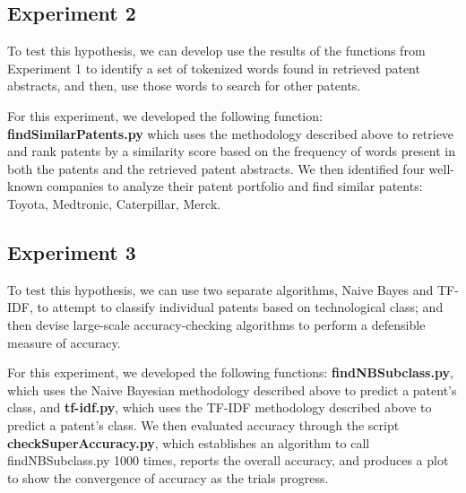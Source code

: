 \documentclass{article}
\begin{document}
\subsection{Experiment 2}
\noindent{}

To test this hypothesis, we can develop use the results of the functions from Experiment 1 to identify a set of tokenized words found in retrieved patent abstracts, and then, use those words to search for other patents.

For this experiment, we developed the following function: \textbf{findSimilarPatents.py} which uses the methodology described above to retrieve and rank patents by a similarity score based on the frequency of words present in both the patents and the retrieved patent abstracts. We then identified four well-known companies to analyze their patent portfolio and find similar patents: Toyota, Medtronic, Caterpillar, Merck.

\subsection{Experiment 3}
\noindent{}

To test this hypothesis, we can use two separate algorithms, Naive Bayes and TF-IDF, to attempt to classify individual patents based on technological class; and then devise large-scale accuracy-checking algorithms to perform a defensible measure of accuracy.

For this experiment, we developed the following functions: \textbf{findNBSubclass.py}, which uses the Naive Bayesian methodology described above to predict a patent’s class, and \textbf{tf-idf.py}, which uses the TF-IDF methodology described above to predict a patent’s class. We then evaluated accuracy through the script \textbf{checkSuperAccuracy.py}, which establishes an algorithm to call findNBSubclass.py 1000 times, reports the overall accuracy, and produces a plot to show the convergence of accuracy as the trials progress.
\end{document}
